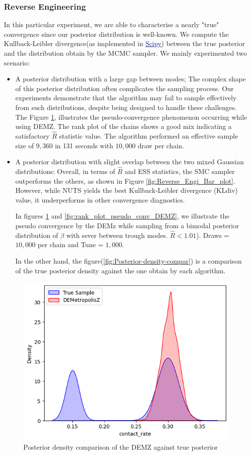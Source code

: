 \documentclass[nonatbib,preprint,12pt,authoryear]{elsarticle}
\begin{document}
\subsubsection{Reverse Engineering}
In this particular experiment, we are able to characterise a nearly "true" convergence since our posterior distribution is well-known. We compute the Kullback-Leibler divergence(as implemented in \href{https://docs.scipy.org/doc/scipy/reference/generated/scipy.special.kl_div.html#scipy.special.kl_div}{\textcolor{blue}{Scipy}}) between the true posterior and the distribution obtain by the MCMC sampler. 
We mainly experimented two scenario:
\begin{itemize}
    \item A posterior distribution with a large gap between modes;
    The complex shape of this posterior distribution often complicates the sampling process. Our experiments demonstrate that the algorithm may fail to sample effectively from such distributions, despite being designed to handle these challenges. The Figure \ref{fig:pseudo_convergence},  illustrates the pseudo-convergence phenomenon occurring while using DEMZ. The rank plot of the chains shows a good mix indicating a satisfactory $\hat{R}$ statistic value. The algorithm performed an effective sample size of $9,360$ in 131 seconds with $10,000$ draw per chain.
    \item A posterior distribution with slight overlap between the two mixed Gaussian distributions:
Overall, in terms of $\hat{R}$ and ESS statistics, the SMC sampler outperforms the others, as shown in Figure \ref{fig:Reverse_Engi_Bar_plot}. However, while NUTS yields the best Kullback-Leibler divergence (KL\textunderscore div) value, it underperforms in other convergence diagnostics. 

In figures \ref{fig:pseudo_convergence} and \ref{fig:rank_plot_pseudo_conv_DEMZ}, we illustrate the pseudo convergence by the DEMz while sampling from a bimodal posterior distribution of $\beta$ with sever between trough modes. $\hat{R} < 1.01$). Draws = $10,000$ per chain and Tune = $1,000$.

In the other hand, the figure(\ref{fig:Posterior-density-compar}) is a comparison of the true posterior density against the one obtain by each algorithm.
\end{itemize}
\begin{figure}[h]
    \centering
    \includegraphics[width=0.5\linewidth]{Figures/Reverse-Ingineering/pseudo_convergence.png}
    \caption{Posterior density comparison of the DEMZ against true posterior}
    \label{fig:pseudo_convergence}
\end{figure}%
\end{document}
